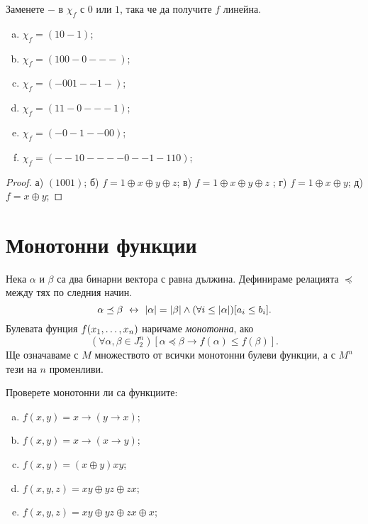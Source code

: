 \begin{problem}
  Заменете $-$ в $\chi_f$ с $0$ или $1$, така че да получите $f$ линейна.
  \begin{enumerate}[a)]
  \item
    $\chi_f = (10-1)$;
  \item
    $\chi_f = (100-0---)$;
  \item
    $\chi_f = (-001--1-)$;
  \item
    $\chi_f = (11-0---1)$;
  \item
    $\chi_f = (-0-1--00)$;
  \item
    $\chi_f = (--10----0--1-110)$;
  \end{enumerate}
\end{problem}
\begin{proof}
  а) $(1001)$; б) $f = 1\oplus x \oplus y\oplus z$; в) $f = 1\oplus x\oplus y\oplus z$ ;
  г) $f = 1\oplus x\oplus y$; д) $f = x\oplus y$;
\end{proof}


\section{Монотонни функции}

Нека $\alpha$ и $\beta$ са два бинарни вектора с равна дължина.
Дефинираме релацията $\preceq$ между тях по следния начин.
\[\alpha \preceq \beta \ \leftrightarrow\  \vert{\alpha}\vert = \vert{\beta}\vert\wedge (\forall i \leq \vert{\alpha}\vert)[a_i \leq b_i].\]
Булевата фунция $f(x_{1},\dots,x_{n})$ наричаме {\em монотонна}, ако 
\[(\forall \alpha,\beta\in J^n_2 )[\alpha\preceq\beta \rightarrow f(\alpha) \leq f(\beta)].\]
Ще означаваме с $M$ множеството от всички монотонни булеви функции, а с $M^n$ тези на $n$ променливи.

\begin{problem}
  Проверете монотонни ли са функциите:
  \begin{enumerate}[a)]
  \item
    $f(x,y) = x\rightarrow (y\rightarrow x)$;
  \item
    $f(x,y) = x\rightarrow (x\rightarrow y)$;
  \item
    $f(x,y) = (x\oplus y)xy$;
  \item
    $f(x,y,z) = xy\oplus yz \oplus zx$;
  \item
    $f(x,y,z) = xy\oplus yz \oplus zx \oplus x$;
  \end{enumerate}
\end{problem}

